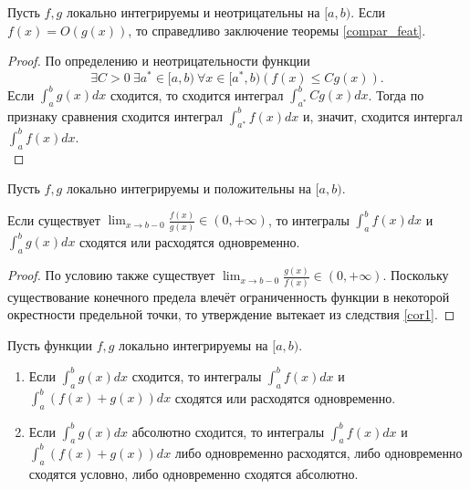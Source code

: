 \begin{corollary}
    \label{cor1}
    Пусть $f, g$ локально интегрируемы и неотрицательны на $[a, b)$. Если $f(x) = O(g(x))$, то справедливо заключение теоремы \ref{compar_feat}.
\end{corollary}

\begin{proof}
    По определению и неотрицательности функции
    \[
        \exists C > 0 \ \exists a^{*} \in [a, b) \ \forall x \in [a^{*}, b) \left(f(x) \leq C g(x)\right).
    \]
    Если $\int_{a}^{b} g(x) dx$ сходится, то сходится интеграл $\int_{a^{*}}^{b} C g(x) dx$. Тогда по признаку сравнения сходится интеграл $\int_{a^{*}}^{b} f(x) dx$ и, значит, сходится интергал $\int_{a}^{b} f(x) dx$. \\
\end{proof}

\begin{corollary}
    \label{compar_feat_cor2}
    Пусть $f, g$ локально интегрируемы и положительны на $[a, b)$.
    
    Если существует $\lim_{x \to b - 0} \frac{f(x)}{g(x)} \in (0, +\infty)$, то интегралы $\int_{a}^{b} f(x) dx$ и $\int_{a}^{b} g(x) dx$ сходятся или расходятся одновременно.
\end{corollary}

\begin{proof}
    По условию также существует $\lim_{x \to b - 0} \frac{g(x)}{f(x)} \in (0, +\infty)$. Поскольку существование конечного предела влечёт ограниченность функции в некоторой окрестности предельной точки, то утверждение вытекает из следствия \ref{cor1}.
\end{proof}

\begin{lemma}
    Пусть функции $f, g$ локально интегрируемы на $[a, b)$.
    \begin{enumerate}
        \item Если $\int_{a}^{b} g(x) dx$ сходится, то интегралы $\int_{a}^{b} f(x) dx$ и $\int_{a}^{b} (f(x) + g(x)) dx$ сходятся или расходятся одновременно.
        \item Если $\int_{a}^{b} g(x) dx$ абсолютно сходится, то интегралы $\int_{a}^{b} f(x) dx$ и $\int_{a}^{b} (f(x) + g(x)) dx$ либо одновременно расходятся, либо одновременно сходятся условно, либо одновременно сходятся абсолютно.
    \end{enumerate}
\end{lemma}

